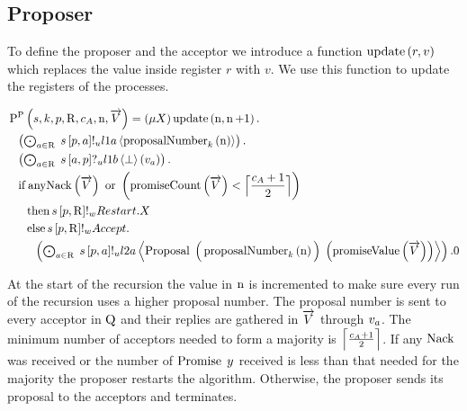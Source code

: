 \subsection{Proposer}
To define the proposer and the acceptor we introduce a function $\operatorname{update} \left(r, v\right)$ which replaces the value inside register $r$ with $v$.
We use this function to update the registers of the processes.

\begin{align*}
&\Pp{
    \SessionChannel,
    \ProcessIndexK,
    \ProposerRole,
    \QRoles,
    \AcceptorCount,
    \NumberRegister,
    \VectorV
} =
\Mu{\RecursionVariable}
\update{\NumberRegister}{\NumberRegister + 1} .\\
&\Indent{1}\DotForall{
    \AcceptorRole \in \QRoles
}{
    \SendUnreliableP{s}{\ProposerRole}{\AcceptorRole}{\LOneA}{\proposalNumber{\NumberRegister}{\ProcessIndexK}}
} .\\
&\Indent{1}\DotForall{
    \AcceptorRole \in \QRoles
}{
    \ReceiveUnreliableP{s}{\AcceptorRole}{\ProposerRole}{\LOneB}{\bot}{v_{\AcceptorRole}}
} .\\
&\Indent{1}\If{
    \anyNack{\VectorV}
    \tOr
    \Paren{\promiseCount{\VectorV} < \ceil{\frac{\AcceptorCount + 1}{2}}}}\\
&\Indent{2}\Then{
    \SendWeaklyP{s}{\ProposerRole}{\QRoles}{\Restart}{\RecursionVariable}
}\\
&\Indent{2}\Else{
    \SendWeaklyP{s}{\ProposerRole}{\QRoles}{\Accept}{\\
    &\Indent{3}\DotForall{
        \AcceptorRole \in \QRoles
    }{
        \SendUnreliableP{s}{\ProposerRole}{\AcceptorRole}{\LTwoA}{
            \ProposalC{
                \Big ( \proposalNumber{\NumberRegister}{\ProcessIndexK} \Big )
            }{
                \Paren{\promiseValue{\VectorV}}
            }
        }
    }.\End
    }
}
\end{align*}

At the start of the recursion the value in $\operatorname{n}$ is incremented to make sure every run of the recursion uses a higher proposal number.
The proposal number is sent to every acceptor in $\operatorname{Q}$ and their replies are gathered in $\overrightarrow{V}$ through $v_{a}$.
The minimum number of acceptors needed to form a majority is $\Big\lceil \frac{c_A + 1}{2} \Big\rceil$.
If any $\operatorname{Nack}$ was received or the number of $\operatorname{Promise}\; y$ received is less than that needed for the majority the proposer restarts the algorithm.
Otherwise, the proposer sends its proposal to the acceptors and terminates.

